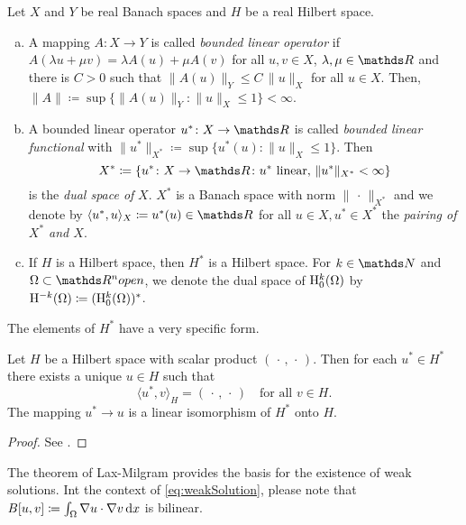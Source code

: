 \begin{defn}
  Let $X$ and $Y$ be real Banach spaces and $H$ be a real Hilbert space.
  \begin{enumerate}[a)]
    \item A mapping $A \colon X \to Y$ is called \emph{bounded linear operator} if $A(\lambda u + \mu v) = \lambda A(u) + \mu A(v)$ for all $u,v \in X$, $\lambda, \mu \in \R$ and there is $C> 0$ such that $\|A(u)\|_Y \leq C \, \|u\|_X$ for all $u \in X$.
      Then, $\|A\| \coloneqq \sup\{\|A(u)\|_Y \colon \|u\|_X \leq 1 \} < \infty$.
    \item A bounded linear operator $u^* \colon X \to \R$ is called \emph{bounded linear functional} with $\|u^*\|_{X^*} \coloneqq \sup\{u^*(u) \colon \|u\|_X \leq 1\}$.
      Then
      $$
      X^* \coloneqq \{ u^* \colon X \to \R \colon u^* \text{ linear, } \|u^*\|_{X^*} < \infty\}
      $$
      is the \emph{dual space of} $X$.
      $X^*$ is a Banach space with norm $\|\,\cdot\,\|_{X^*}$ and we denote by $\langle u^*, u\rangle_X \coloneqq u^*(u) \in \R$ for all $u \in X, u^* \in X^*$ the \emph{pairing of $X^*$ and $X$}.
    \item If $H$ is a Hilbert space, then $H^*$ is a Hilbert space.
      For $k \in \N$ and $\Omega \subset \R^n open$, we denote the dual space of $\mathrm{H}_0^k(\Omega)$ by $\mathrm{H}^{-k}(\Omega) \coloneq (\mathrm{H}_0^k(\Omega))^*$.
  \end{enumerate}
\end{defn}

The elements of $H^*$ have a very specific form.

\begin{thm}
  \label{thm:RieszFrechet}
  Let $H$ be a Hilbert space with scalar product $(\,\cdot\, , \,\cdot\,)$.
  Then for each $u^* \in H^*$ there exists a unique $u \in H$ such that
  $$
  \langle u^*, v \rangle_H = (\,\cdot\, , \,\cdot\,) \quad\text{for all } v \in H.
  $$
  The mapping $u^* \to u$ is a linear isomorphism of $H^*$ onto $H$.
\end{thm}

\begin{proof}
  See \cite[Satz 2.25]{dobrowolski2010angewandte}.
\end{proof}

The theorem of Lax-Milgram provides the basis for the existence of weak solutions.
Int the context of \eqref{eq:weakSolution}, please note that $B[u,v] \coloneqq \int_\Omega \nabla u \cdot \nabla v \, {\operatorname{d}\!{x}}$ is bilinear.

